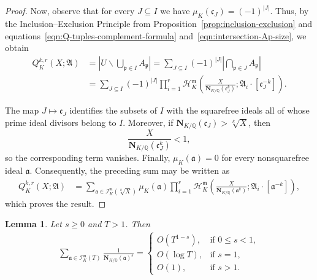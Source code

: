\documentclass[11pt, reqno]{amsart}
\numberwithin{equation}{section}
\newtheorem{lemma}[theorem]{Lemma}
\newcommand{\Q}{\mathbb{Q}}
\newcommand{\Nrm}[2]{\mathbf{N}_{#1}(#2)}
\theoremstyle{definition}
\begin{document}
\begin{proof}
Now, observe that for every $J\subseteq I$ we have $\mu_K(\mathfrak{c}_J)=(-1)^{|J|}$. Thus, by the Inclusion--Exclusion Principle from
Proposition~\ref{prop:inclusion-exclusion} and
equations~\eqref{eqn:Q-tuples-complement-formula}
and~\eqref{eqn:intersection-Ap-size}, we obtain
\begin{align*}
Q_K^{k,r}(X;\boldsymbol{\mathfrak{A}})
&=
\left|
U\smallsetminus
\bigcup_{\mathfrak{p}\in I}A_{\mathfrak{p}}
\right|
=
\sum_{J\subseteq I}
(-1)^{|J|}
\left|
\bigcap_{\mathfrak{p}\in J}A_{\mathfrak{p}}
\right|\\
&=
\sum_{J\subseteq I}
(-1)^{|J|}
\prod_{i=1}^{r}
\mathcal{H}_K^{\mathfrak{m}}
\left(
\frac{X}{\Nrm{K/\Q}{\mathfrak{c}_J^k}};
\mathfrak{A}_i\cdot[\mathfrak{c}_J^{-k}]
\right).
\end{align*}

The map $J\mapsto\mathfrak{c}_J$ identifies the subsets of $I$ with
the squarefree ideals all of whose prime ideal divisors belong to $I$.
Moreover, if
$\Nrm{K/\Q}{\mathfrak{c}_J}>\sqrt[k]{X}$, then
\[
\frac{X}{\Nrm{K/\Q}{\mathfrak{c}_J^k}}<1,
\]
so the corresponding term vanishes. Finally,
$\mu_K(\mathfrak{a})=0$ for every nonsquarefree ideal $\mathfrak{a}$.
Consequently, the preceding sum may be written as
\begin{align*}
Q_K^{k,r}(X;\boldsymbol{\mathfrak{A}})
&=
\sum_{\mathfrak{a}\in
\mathcal{I}_K^{\mathfrak{m}}(\sqrt[k]{X})}
\mu_K(\mathfrak{a})
\prod_{i=1}^{r}
\mathcal{H}_K^{\mathfrak{m}}
\left(
\frac{X}{\Nrm{K/\Q}{\mathfrak{a}^k}};
\mathfrak{A}_i\cdot[\mathfrak{a}^{-k}]
\right),
\end{align*}
which proves the result.
\end{proof}


\begin{lemma}\label{lem:several-cases-estimation}
Let $s\geq 0$ and $T > 1$. Then
\begin{align*}
\sum_{\mathfrak{a}\in\mathcal{I}_K^{\mathfrak{m}}(T)}
\frac{1}{\Nrm{K/\Q}{\mathfrak{a}}^s}
=
\begin{cases}
O(T^{1-s}), & \text{if $0\leq s<1$},\\[4pt]
O(\log T), & \text{if $s=1$},\\[4pt]
O(1), & \text{if $s>1$}.
\end{cases}
\end{align*}
\end{lemma}
\end{document}
